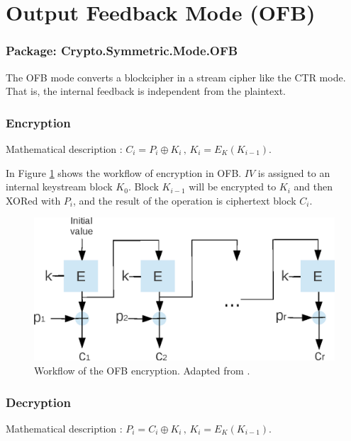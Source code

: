 
\section{Output Feedback Mode (OFB)}\label{OutputFeedbackMode}
\subsubsection*{Package: Crypto.Symmetric.Mode.OFB}
The OFB mode converts a blockcipher in a stream cipher like the CTR
mode. That is, the internal feedback is independent from the
plaintext.


\subsubsection*{Encryption}
Mathematical description : $C_i=P_i\oplus K_i\,,\, K_i=E_K(K_{i-1})$.

In Figure \ref{OFBEN} shows the workflow of encryption in OFB.  $IV$
is assigned to an internal keystream block $K_0$. Block $K_{i-1}$ will
be encrypted to $K_i$ and then XORed with $P_i$, and the result of the
operation is ciphertext block $C_i$.
\begin{figure}[h]
\centering
\includegraphics[scale=0.8]{./images/OFB_En}
\caption{Workflow of the OFB encryption. Adapted from
  \cite{DBLP:reference/crypt/2011}.}\label{OFBEN}
\end{figure}

\subsubsection*{Decryption}
Mathematical description : $P_i=C_i\oplus K_i\,,\,
K_i=E_K(K_{i-1})$.

